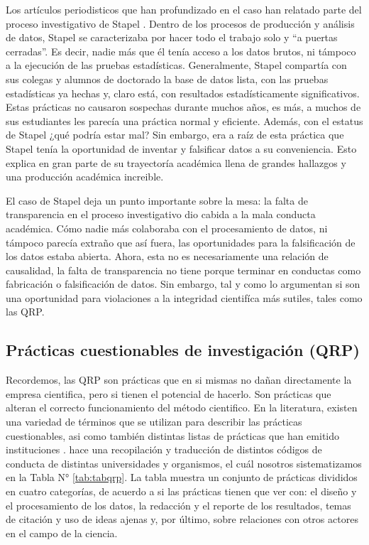\documentclass[
]{book}
\begin{document}
Los artículos periodisticos que han profundizado en el caso han relatado parte del proceso investigativo de Stapel \citep[e.g.][]{carey_Fraud_2011}. Dentro de los procesos de producción y análisis de datos, Stapel se caracterizaba por hacer todo el trabajo solo y ``a puertas cerradas''. Es decir, nadie más que él tenía acceso a los datos brutos, ni támpoco a la ejecución de las pruebas estadísticas. Generalmente, Stapel compartía con sus colegas y alumnos de doctorado la base de datos lista, con las pruebas estadísticas ya hechas y, claro está, con resultados estadísticamente significativos. Estas prácticas no causaron sospechas durante muchos años, es más, a muchos de sus estudiantes les parecía una práctica normal y eficiente. Además, con el estatus de Stapel ¿qué podría estar mal? Sin embargo, era a raíz de esta práctica que Stapel tenía la oportunidad de inventar y falsificar datos a su conveniencia. Esto explica en gran parte de su trayectoría académica llena de grandes hallazgos y una producción académica increible.

El caso de Stapel deja un punto importante sobre la mesa: la falta de transparencia en el proceso investigativo dio cabida a la mala conducta académica. Cómo nadie más colaboraba con el procesamiento de datos, ni támpoco parecía extraño que así fuera, las oportunidades para la falsificación de los datos estaba abierta. Ahora, esta no es necesariamente una relación de causalidad, la falta de transparencia no tiene porque terminar en conductas como fabricación o falsificación de datos. Sin embargo, tal y como lo argumentan \citet{oboyle_Chrysalis_2017} si son una oportunidad para violaciones a la integridad cientifíca más sutiles, tales como las QRP.

\hypertarget{pruxe1cticas-cuestionables-de-investigaciuxf3n-qrp}{%
\subsection{Prácticas cuestionables de investigación (QRP)}\label{pruxe1cticas-cuestionables-de-investigaciuxf3n-qrp}}

Recordemos, las QRP son prácticas que en si mismas no dañan directamente la empresa cientifica, pero si tienen el potencial de hacerlo. Son prácticas que alteran el correcto funcionamiento del método cientifico. En la literatura, existen una variedad de términos que se utilizan para describir las prácticas cuestionables, asi como también distintas listas de prácticas que han emitido instituciones . \citet{abrilruiz_Manzanas_2019} hace una recopilación y traducción de distintos códigos de conducta de distintas universidades y organismos, el cuál nosotros sistematizamos en la Tabla N° \ref{tab:tabqrp}. La tabla muestra un conjunto de prácticas divididos en cuatro categorías, de acuerdo a si las prácticas tienen que ver con: el diseño y el procesamiento de los datos, la redacción y el reporte de los resultados, temas de citación y uso de ideas ajenas y, por último, sobre relaciones con otros actores en el campo de la ciencia.
\end{document}

